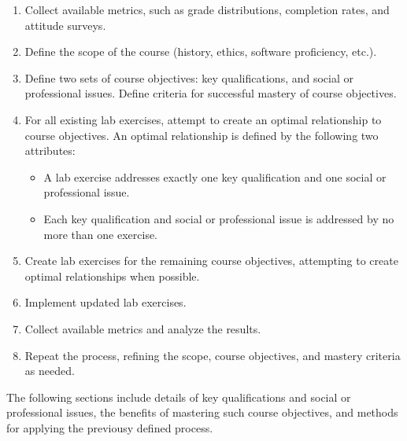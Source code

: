 \begin{enumerate}
  \item Collect available metrics, such as grade distributions, completion
  rates, and attitude surveys.
  \item Define the scope of the course (history, ethics, software proficiency,
  etc.).
  \item Define two sets of course objectives:  key qualifications, and social
  or professional issues.  Define criteria for successful mastery of
  course objectives.
  \item For all existing lab exercises, attempt to create an optimal
  relationship to course objectives.  An optimal relationship is defined by the
  following two attributes:
  \begin{itemize}
    \item A lab exercise addresses exactly one key qualification and one
    social or professional issue.
    \item Each key qualification and social or professional issue is addressed
    by no more than one exercise.
  \end{itemize}
  \item Create lab exercises for the remaining course objectives, attempting to
  create optimal relationships when possible.
  \item Implement updated lab exercises.
  \item Collect available metrics and analyze the results.
  \item Repeat the process, refining the scope, course objectives, and mastery
  criteria as needed.
\end{enumerate}

The following sections include details of key qualifications and social
or professional issues, the benefits of mastering such course objectives, and
methods for applying the previousy defined process.




	
	
	

